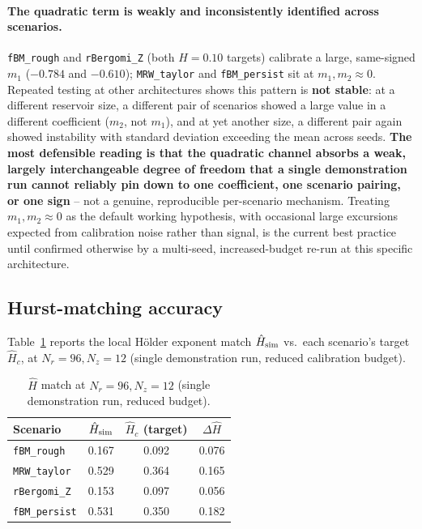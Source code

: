 \documentclass[11pt,a4paper]{article}
\begin{document}
\paragraph{The quadratic term is weakly and inconsistently identified
across scenarios.} \texttt{fBM\_rough} and \texttt{rBergomi\_Z} (both
$H=0.10$ targets) calibrate a large, same-signed $m_1$ ($-0.784$ and
$-0.610$); \texttt{MRW\_taylor} and \texttt{fBM\_persist} sit at
$m_1,m_2\approx0$. Repeated testing at other architectures shows this
pattern is \textbf{not stable}: at a different reservoir size, a
different pair of scenarios showed a large value in a different
coefficient ($m_2$, not $m_1$), and at yet another size, a different
pair again showed instability with standard deviation exceeding the
mean across seeds. \textbf{The most defensible reading is that the
quadratic channel absorbs a weak, largely interchangeable degree of
freedom that a single demonstration run cannot reliably pin down to
one coefficient, one scenario pairing, or one sign} -- not a genuine,
reproducible per-scenario mechanism. Treating $m_1,m_2\approx0$ as the
default working hypothesis, with occasional large excursions expected
from calibration noise rather than signal, is the current best
practice until confirmed otherwise by a multi-seed, increased-budget
re-run at this specific architecture.

\subsection{Hurst-matching accuracy}
\label{sec:hurst}

Table~\ref{tab:hurst} reports the local H\"older exponent match
$\hat H_{\rm sim}$ vs.\ each scenario's target $\hat H_c$, at
$N_r=96,N_z=12$ (single demonstration run, reduced calibration
budget).

\begin{table}[h]
\centering
\caption{$\hat H$ match at $N_r=96,N_z=12$ (single demonstration run, reduced budget).}
\label{tab:hurst}
\begin{tabular}{@{}lccc@{}}
\toprule
Scenario & $\hat H_{\rm sim}$ & $\hat H_c$ (target) & $\Delta\hat H$ \\
\midrule
\texttt{fBM\_rough}   & 0.167 & 0.092 & 0.076 \\
\texttt{MRW\_taylor}  & 0.529 & 0.364 & 0.165 \\
\texttt{rBergomi\_Z}  & 0.153 & 0.097 & 0.056 \\
\texttt{fBM\_persist} & 0.531 & 0.350 & 0.182 \\
\bottomrule
\end{tabular}
\end{table}
\end{document}
